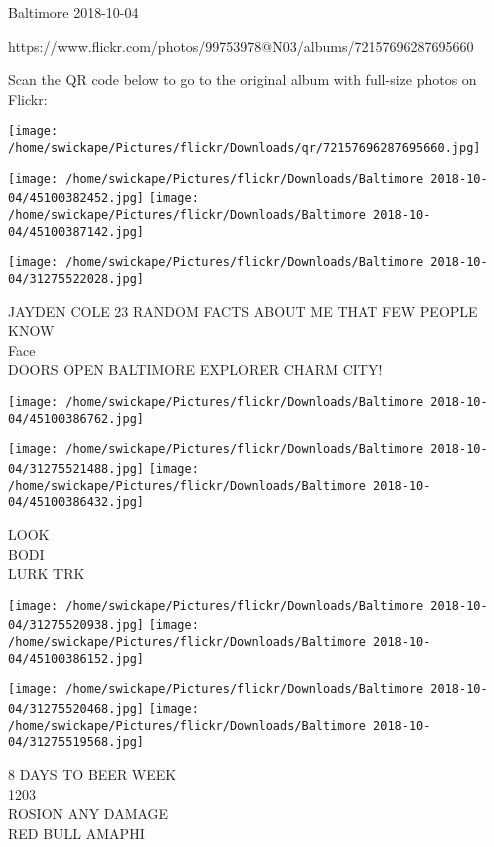 \documentclass[10pt,letterpaper]{article}
\begin{document}
Baltimore 2018-10-04

https://www.flickr.com/photos/99753978@N03/albums/72157696287695660

Scan the QR code below to go to the original album with full-size photos on Flickr:

\texttt{[image: /home/swickape/Pictures/flickr/Downloads/qr/72157696287695660.jpg]}
\pagebreak

\texttt{[image: /home/swickape/Pictures/flickr/Downloads/Baltimore 2018-10-04/45100382452.jpg]}
\texttt{[image: /home/swickape/Pictures/flickr/Downloads/Baltimore 2018-10-04/45100387142.jpg]}

\texttt{[image: /home/swickape/Pictures/flickr/Downloads/Baltimore 2018-10-04/31275522028.jpg]}

JAYDEN COLE 23 RANDOM FACTS ABOUT ME THAT FEW PEOPLE KNOW\\
Face\\
DOORS OPEN BALTIMORE EXPLORER CHARM CITY!\\
\pagebreak

\texttt{[image: /home/swickape/Pictures/flickr/Downloads/Baltimore 2018-10-04/45100386762.jpg]}

\vspace{0.25in}
\texttt{[image: /home/swickape/Pictures/flickr/Downloads/Baltimore 2018-10-04/31275521488.jpg]}
\texttt{[image: /home/swickape/Pictures/flickr/Downloads/Baltimore 2018-10-04/45100386432.jpg]}

LOOK\\
BODI\\
LURK TRK\\
\pagebreak

\texttt{[image: /home/swickape/Pictures/flickr/Downloads/Baltimore 2018-10-04/31275520938.jpg]}
\texttt{[image: /home/swickape/Pictures/flickr/Downloads/Baltimore 2018-10-04/45100386152.jpg]}

\texttt{[image: /home/swickape/Pictures/flickr/Downloads/Baltimore 2018-10-04/31275520468.jpg]}
\texttt{[image: /home/swickape/Pictures/flickr/Downloads/Baltimore 2018-10-04/31275519568.jpg]}

8 DAYS TO BEER WEEK\\
1203\\
ROSION ANY DAMAGE\\
RED BULL AMAPHI\\
\pagebreak
\end{document}
